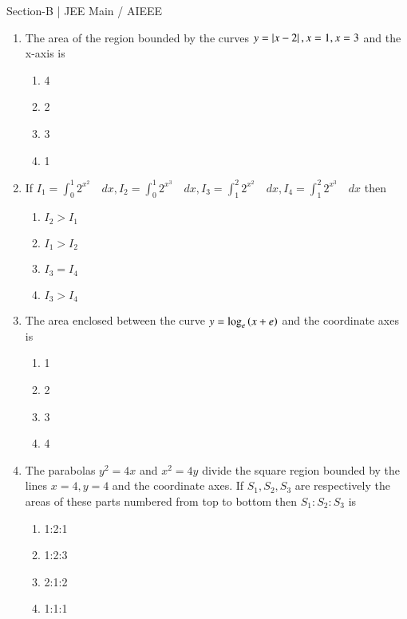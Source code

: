 \documentclass[journal]{IEEEtran}
\begin{document}
\bigskip
Section-B | JEE Main / AIEEE
	\begin{enumerate}
    [start=16]
	      \item 
		The area of the region bounded by the curves $y=\left\vert x-2\right\vert, x=1, x=3$ and the x-axis is \quad \quad \quad
        \quad \quad \hfill {}
		     \begin{enumerate}
		              \item 4
		              \item 2
		              \item 3
		              \item 1
		     \end{enumerate}     
	      \item
           If $I_1=\int_{0}^{1} 2^{x^{2}} \quad dx,I_2=\int_{0}^{1} 2^{x^{3}} \quad dx,I_3=\int_{1}^{2} 2^{x^{2}} \quad dx, I_4=\int_{1}^{2} 2^{x^{3}} \quad dx
          $ then 
          \hfill {} 
          \begin{enumerate}
                   \item $I_2>I_1$
                   \item $I_1>I_2$
                   \item $I_3=I_4$
                   \item $I_3>I_4$
          \end{enumerate}
	      \item
		      The area enclosed between the curve $y=\log_e\left(x+e\right)$ and the coordinate  axes is 
		     \hfill {} 
		     \begin{enumerate}
		              \item 1
		              \item 2
		              \item 3
		              \item 4
		     \end{enumerate}
	      \item 
		      The parabolas $y^{2}=4x$ and $x^{2}=4y$ divide the square region bounded by the lines $x=4, y=4$ and the coordinate axes. If $S_1, S_2, S_3$ are respectively the areas of these parts numbered from top to bottom then $S_1:S_2:S_3$ is
		     \hfill {} 
		     \begin{enumerate}
		             \item 1:2:1
		             \item 1:2:3
		             \item 2:1:2
		             \item 1:1:1

\end{enumerate}
\end{enumerate}
\end{document}
